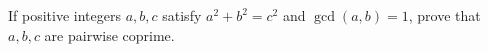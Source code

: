 If positive integers $a,b,c$ satisfy $a^2+b^2=c^2$ and $\gcd(a,b)=1$, prove that $a,b,c$ are pairwise coprime.
